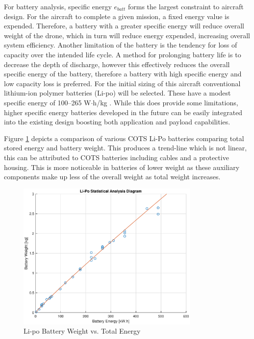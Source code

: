 For battery analysis, specific energy $e_{batt}$ forms the largest constraint to aircraft design. For the aircraft to complete a given mission, a fixed energy value is expended. Therefore, a battery with a greater specific energy will reduce overall weight of the drone, which in turn will reduce energy expended, increasing overall system efficiency. Another limitation of the battery is the tendency for loss of capacity over the intended life cycle. A method for prolonging battery life is to decrease the depth of discharge, however this effectively reduces the overall specific energy of the battery, therefore a battery with high specific energy and low capacity loss is preferred. For the initial sizing of this aircraft conventional lithium-ion polymer batteries (Li-po) will be selected. These have a modest specific energy of 100–265 W$\cdot$h/kg . While this does provide some limitations, higher specific energy batteries developed in the future can be easily integrated into the existing design boosting both application and payload capabilities.  

\vspace{1cm}

Figure \ref{fig:statbatt} depicts a comparison of various COTS Li-Po batteries comparing total stored energy and battery weight. This produces a trend-line which is not linear, this can be attributed to COTS batteries including cables and a protective housing. This is more noticeable in batteries of lower weight as these auxiliary components make up less of the overall weight as total weight increases.
\begin{figure}[H]
    \centering
    \includegraphics[width = 0.8\textwidth]{PrelimSizing/lipo.eps}
    \caption{Li-po Battery Weight vs. Total Energy}
    \label{fig:statbatt}
\end{figure}

